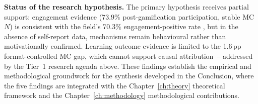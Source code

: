 \textbf{Status of the research hypothesis.}
The primary hypothesis receives partial support: engagement evidence (73.9\% post-gamification participation, stable MC~$N$) is consistent with the field's 70.3\% engagement-positive rate \cite{KorniienkoSemerikov2024}, but in the absence of self-report data, mechanisms remain behavioural rather than motivationally confirmed. Learning outcome evidence is limited to the 1.6\,pp format-controlled MC gap, which cannot support causal attribution~-- addressed by the Tier~1 research agenda above. These findings establish the empirical and methodological groundwork for the synthesis developed in the Conclusion, where the five findings are integrated with the Chapter~\ref{ch:theory} theoretical framework and the Chapter~\ref{ch:methodology} methodological contributions.
